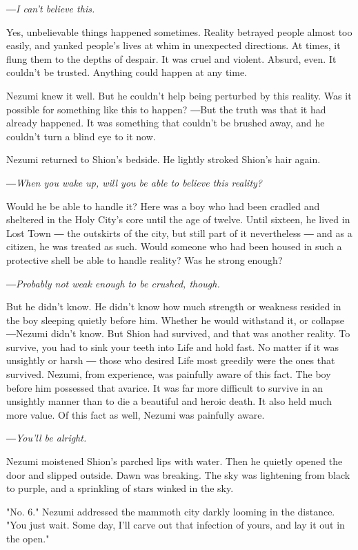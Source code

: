 \emph{―I can't believe this.}

Yes, unbelievable things happened sometimes. Reality betrayed people
almost too easily, and yanked people's lives at whim in unexpected
directions. At times, it flung them to the depths of despair. It was
cruel and violent. Absurd, even. It couldn't be trusted. Anything could
happen at any time.

Nezumi knew it well. But he couldn't help being perturbed by this
reality. Was it possible for something like this to happen? ―But the
truth was that it had already happened. It was something that couldn't
be brushed away, and he couldn't turn a blind eye to it now.

Nezumi returned to Shion's bedside. He lightly stroked Shion's hair
again.

\emph{―When you wake up, will you be able to believe this reality?}

Would he be able to handle it? Here was a boy who had been cradled and
sheltered in the Holy City's core until the age of twelve. Until
sixteen, he lived in Lost Town ― the outskirts of the city, but still
part of it nevertheless ― and as a citizen, he was treated as such.
Would someone who had been housed in such a protective shell be able to
handle reality? Was he strong enough?

\emph{―Probably not weak enough to be crushed, though.}

But he didn't know. He didn't know how much strength or weakness resided
in the boy sleeping quietly before him. Whether he would withstand it,
or collapse ―Nezumi didn't know. But Shion had survived, and that was
another reality. To survive, you had to sink your teeth into Life and
hold fast. No matter if it was unsightly or harsh ― those who desired
Life most greedily were the ones that survived. Nezumi, from experience,
was painfully aware of this fact. The boy before him possessed that
avarice. It was far more difficult to survive in an unsightly manner
than to die a beautiful and heroic death. It also held much more value.
Of this fact as well, Nezumi was painfully aware.

\emph{―You'll be alright.}

Nezumi moistened Shion's parched lips with water. Then he quietly opened
the door and slipped outside. Dawn was breaking. The sky was lightening
from black to purple, and a sprinkling of stars winked in the sky.

"No. 6." Nezumi addressed the mammoth city darkly looming in the
distance. "You just wait. Some day, I'll carve out that infection of
yours, and lay it out in the open."

